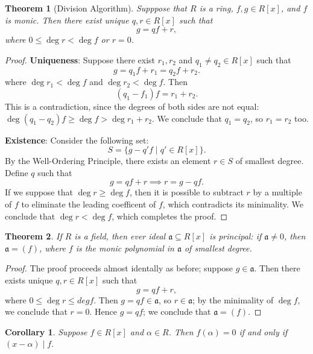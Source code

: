 \documentclass[11pt]{article}
\newtheorem{theorem}{Theorem}
\newtheorem{corollary}{Corollary}
\begin{document}
\begin{theorem}[Division Algorithm]
	Supppose that $R$ is a ring, $f, g \in R[x]$, and $f$ is monic. Then there exist unique $q, r \in R[x]$ such that
	\[
		g = qf + r,
	\]
	where $0 \le \deg r < \deg f$ or $r = 0$.
\end{theorem}
\begin{adjustwidth}{0.5cm}{}
	\begin{proof}
		\textbf{Uniqueness}: Suppose there exist $r_{1}, r_{2}$ and $q_{1} \ne q_{2} \in R[x]$ such that
		\[
			g = q_{1}f + r_{1} = q_{2}f + r_{2}.
		\]
		where $\deg r_{1} < \deg f$ and $\deg r_{2} < \deg f$. Then
		\[
			(q_{1} - f_{1}) f = r_{1} + r_{2}.
		\]
		This is a contradiction, since the degrees of both sides are not equal: $\deg (q_{1} - q_{2}) f \ge \deg f > \deg r_{1} + r_{2}$. We conclude that $q_{1} = q_{2}$, so $r_{1} = r_{2}$ too.

		\textbf{Existence}: Consider the following set:
		\[
			S = \{ g - q'f \mid q' \in R[x] \}.
		\]
		By the Well-Ordering Principle, there exists an element $r \in S$ of smallest degree. Define $q$ such that
		\[
			g = qf + r \implies r = g - qf.
		\]
    If we suppose that $\deg r \ge \deg f$, then it is possible to subtract $r$ by a multiple of $f$ to eliminate the leading coefficent of $f$, which contradicts its minimality. We conclude that $\deg r < \deg f$, which completes the proof.
	\end{proof}
\end{adjustwidth}

\begin{theorem}
	If $R$ is a field, then ever ideal $\mathfrak{a} \subseteq R[x]$ is principal: if $\mathfrak{a} \ne 0$, then $\mathfrak{a} = (f)$, where $f$ is the monic polynomial in $\mathfrak{a}$ of smallest degree.
\end{theorem}
\begin{adjustwidth}{0.5cm}{}
	\begin{proof}
		The proof proceeds almost identally as before; suppose $g \in \mathfrak{a}$. Then there exists unique $q, r \in R[x]$ such that 
		\[
			g = qf + r,
		\]
		where $0 \le \deg r \le deg f$. Then $g = qf \in \mathfrak{a}$, so $r \in \mathfrak{a}$; by the minimality of $\deg f$, we conclude that $r = 0$. Hence $g = qf$; we conclude that $\mathfrak{a} = (f)$.
	\end{proof}
\end{adjustwidth}

\begin{corollary}
	Suppose $f \in R[x]$ and $\alpha \in R$. Then $f(\alpha) = 0$ if and only if $(x - \alpha) \mid f$.
\end{corollary}
\end{document}
